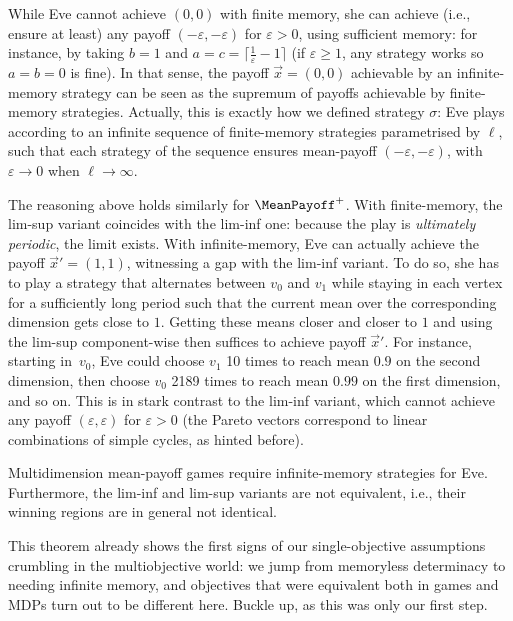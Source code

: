 \begin{remark}
While Eve cannot achieve $(0, 0)$ with finite memory, she can achieve (i.e., ensure at least) any payoff $(-\varepsilon, -\varepsilon)$ for $\varepsilon > 0$, using sufficient memory: for instance, by taking $b = 1$ and $a = c = \lceil \frac{1}{\varepsilon} - 1\rceil$ (if $\varepsilon \geq 1$, any strategy works so $a = b = 0$ is fine). In that sense, the payoff $\vec{x} = (0, 0)$ achievable by an infinite-memory strategy can be seen as the supremum of payoffs achievable by finite-memory strategies. Actually, this is exactly how we defined strategy $\sigma$: Eve plays according to an infinite sequence of finite-memory strategies parametrised by $\ell$, such that each strategy of the sequence ensures mean-payoff $(-\varepsilon, -\varepsilon)$, with $\varepsilon \to 0$ when $\ell \to \infty$.
\end{remark}

\begin{example}
\label{13-ex:MMP3}
The reasoning above holds similarly for $\MeanPayoff^{+}$. With finite-memory, the lim-sup variant coincides with the lim-inf one: because the play is \textit{ultimately periodic}, the limit exists. With infinite-memory, Eve can actually achieve the payoff $\vec{x}' = (1, 1)$, witnessing a gap with the lim-inf variant. To do so, she has to play a strategy that alternates between $v_0$ and $v_1$ while staying in each vertex for a sufficiently long period such that the current mean over the corresponding dimension gets close to $1$. Getting these means closer and closer to $1$ and using the lim-sup component-wise then suffices to achieve payoff $\vec{x}'$. For instance, starting in~$v_0$, Eve could choose  $v_1$ 10 times to reach mean $0.9$ on the second dimension, then choose $v_0$ 2189 times to reach mean $0.99$ on the first dimension, and so on. This is in stark contrast to the lim-inf variant, which cannot achieve any payoff $(\varepsilon, \varepsilon)$ for $\varepsilon > 0$ (the Pareto vectors correspond to linear combinations of simple cycles, as hinted before).
\end{example}

\begin{theorem}
\label{13-thm:MMP-Eve}
Multidimension mean-payoff games require infinite-memory strategies for Eve. Furthermore, the lim-inf and lim-sup variants are not equivalent, i.e., their winning regions are in general not identical.
\end{theorem}

This theorem already shows the first signs of our single-objective assumptions crumbling in the multiobjective world: we jump from memoryless determinacy to needing infinite memory, and objectives that were equivalent both in games and MDPs turn out to be different here. Buckle up, as this was only our first step.





